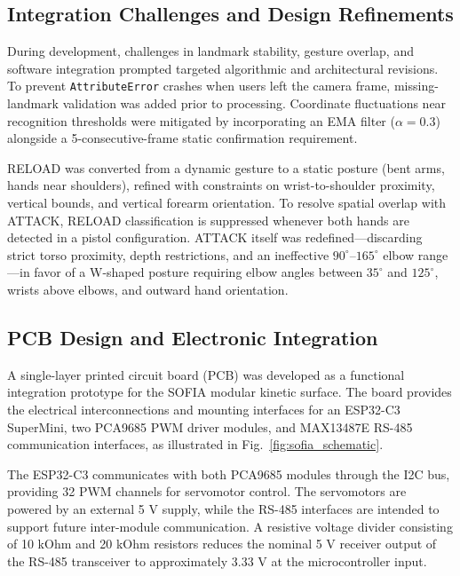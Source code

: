 \documentclass[lettersize,journal]{IEEEtran}
\begin{document}
	\subsection{Integration Challenges and Design Refinements}
	
	During development, challenges in landmark stability, gesture overlap, and software integration prompted targeted algorithmic and architectural revisions. To prevent \texttt{AttributeError} crashes when users left the camera frame, missing-landmark validation was added prior to processing. Coordinate fluctuations near recognition thresholds were mitigated by incorporating an EMA filter ($\alpha = 0.3$) alongside a 5-consecutive-frame static confirmation requirement.
	
	RELOAD was converted from a dynamic gesture to a static posture (bent arms, hands near shoulders), refined with constraints on wrist-to-shoulder proximity, vertical bounds, and vertical forearm orientation. 
	To resolve spatial overlap with ATTACK, RELOAD classification is suppressed whenever both hands are detected in a pistol configuration. ATTACK itself was redefined—discarding strict torso proximity, depth restrictions, and an ineffective $90^\circ$–$165^\circ$ elbow range—in favor of a W-shaped posture requiring elbow angles between $35^\circ$ and $125^\circ$, wrists above elbows, and outward hand orientation.
	
	\subsection{PCB Design and Electronic Integration}
	\label{subsec:pcb_design}
	
	A single-layer printed circuit board (PCB)
	was developed as a functional integration
	prototype for the SOFIA modular kinetic
	surface. The board provides the electrical
	interconnections and mounting interfaces
	for an ESP32-C3 SuperMini, two PCA9685
	PWM driver modules, and MAX13487E RS-485
	communication interfaces, as illustrated
	in Fig.~\ref{fig:sofia_schematic}.
	
	The ESP32-C3 communicates with both PCA9685
	modules through the I2C bus, providing
	32 PWM channels for servomotor control.
	The servomotors are powered by an external
	5 V supply, while the RS-485 interfaces
	are intended to support future inter-module
	communication. A resistive voltage divider
	consisting of 10 kOhm and 20 kOhm resistors
	reduces the nominal 5 V receiver output
	of the RS-485 transceiver to approximately
	3.33 V at the microcontroller input.
	
\end{document}
